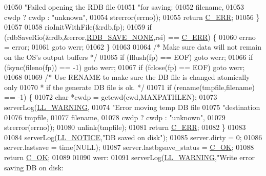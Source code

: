 \begin{DoxyCode}
{{{{{{{{{{01050             \textcolor{stringliteral}{"Failed opening the RDB file %
01051             \textcolor{stringliteral}{"for saving: %
01052             filename,
01053             cwdp ? cwdp : \textcolor{stringliteral}{"unknown"},
01054             strerror(errno));
01055         \textcolor{keywordflow}{return} \hyperlink{server_8h_af98ac28d5f4d23d7ed5985188e6fb7d1}{C\_ERR};
01056     \}
01057 
01058     rioInitWithFile(&rdb,fp);
01059     \textcolor{keywordflow}{if} (rdbSaveRio(&rdb,&error,\hyperlink{rdb_8h_a2f6a651ce17c73ec98c3a4ac25bc2aa7}{RDB\_SAVE\_NONE},rsi) == \hyperlink{server_8h_af98ac28d5f4d23d7ed5985188e6fb7d1}{C\_ERR}) \{
01060         errno = error;
01061         \textcolor{keywordflow}{goto} werr;
01062     \}
01063 
01064     \textcolor{comment}{/* Make sure data will not remain on the OS's output buffers */}
01065     \textcolor{keywordflow}{if} (fflush(fp) == EOF) \textcolor{keywordflow}{goto} werr;
01066     \textcolor{keywordflow}{if} (fsync(fileno(fp)) == -1) \textcolor{keywordflow}{goto} werr;
01067     \textcolor{keywordflow}{if} (fclose(fp) == EOF) \textcolor{keywordflow}{goto} werr;
01068 
01069     \textcolor{comment}{/* Use RENAME to make sure the DB file is changed atomically only}
01070 \textcolor{comment}{     * if the generate DB file is ok. */}
01071     \textcolor{keywordflow}{if} (rename(tmpfile,filename) == -1) \{
01072         \textcolor{keywordtype}{char} *cwdp = getcwd(cwd,MAXPATHLEN);
01073         serverLog(\hyperlink{server_8h_a31229b9334bba7d6be2a72970967a14b}{LL\_WARNING},
01074             \textcolor{stringliteral}{"Error moving temp DB file %
01075             \textcolor{stringliteral}{"destination %
01076             tmpfile,
01077             filename,
01078             cwdp ? cwdp : \textcolor{stringliteral}{"unknown"},
01079             strerror(errno));
01080         unlink(tmpfile);
01081         \textcolor{keywordflow}{return} \hyperlink{server_8h_af98ac28d5f4d23d7ed5985188e6fb7d1}{C\_ERR};
01082     \}
01083 
01084     serverLog(\hyperlink{server_8h_a8c54c191e436c7dd3012167212692401}{LL\_NOTICE},\textcolor{stringliteral}{"DB saved on disk"});
01085     server.dirty = 0;
01086     server.lastsave = time(NULL);
01087     server.lastbgsave\_status = \hyperlink{server_8h_a303769ef1065076e68731584e758d3e1}{C\_OK};
01088     \textcolor{keywordflow}{return} \hyperlink{server_8h_a303769ef1065076e68731584e758d3e1}{C\_OK};
01089 
01090 werr:
01091     serverLog(\hyperlink{server_8h_a31229b9334bba7d6be2a72970967a14b}{LL\_WARNING},\textcolor{stringliteral}{"Write error saving DB on disk: %
}}}}}}}}}}}}}}}
\end{DoxyCode}
